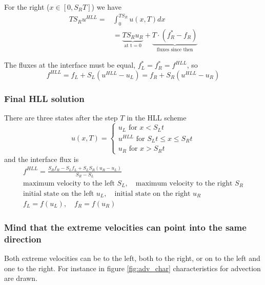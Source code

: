 For the right ($x \in [0, S_R T]$) we have
\begin{equation}
    \begin{aligned}
        T S_R u^{H L L}= & \int_{0}^{T S_R} u(x, T) d x \\
        & = \underbrace{T S_R u_R}_{\text{at t} = 0} + \underbrace{T \cdot\left(f_R^*-f_R\right)}_{\text{fluxes since then}}
    \end{aligned}
\end{equation}

The fluxes at the interface must be equal, $f_L^* = f_R^* = f^{HLL}$, so
\begin{equation}
    f^{H L L}=f_L+S_L\left(u^{H L L}-u_L\right)=f_R+S_R\left(u^{H L L}-u_R\right)
\end{equation}

\subsubsection{Final HLL solution}
There are three states after the step $T$ in the HLL scheme
\begin{equation}
    u(x, T)=\left\{\begin{array}{c}
    u_L \text { for } x<S_L t \\
    u^{H L L} \text { for } S_L t \leq x \leq S_R t \\
    u_R \text { for } x>S_R t
    \end{array}\right.
\end{equation}
and the interface flux is
\begin{equation}
    \begin{gathered}
        f^{H L L}=\frac{S_R f_R-S_L f_L+S_L S_R\left(u_R-u_L\right)}{S_R-S_L} \\
        \text{maximum velocity to the left } S_L, \quad \text{maximum velocity to the right } S_R \\
        \text{initial state on the left } u_L, \quad \text{initial state on the right } u_R \\
        f_L = f(u_L), \quad f_R = f(u_R)
    \end{gathered}
\end{equation}

\subsubsection{Mind that the extreme velocities can point into the same direction}
Both extreme velocities can be to the left, both to the right, or on to the left and one to the right.
For instance in figure \ref{fig:adv_char} characteristics for advection are drawn.

